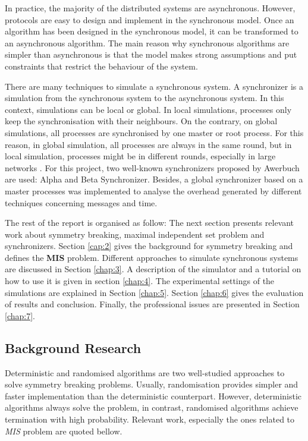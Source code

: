 In practice, the majority of the distributed systems are asynchronous. However, protocols are easy to design and implement in the synchronous model. Once an algorithm has been designed in the synchronous model, it can be transformed to an asynchronous algorithm. The main reason why synchronous algorithms are simpler than asynchronous is that the model makes strong assumptions and put constraints that restrict the behaviour of the system.

There are many techniques to simulate a synchronous system. A synchronizer is a simulation from the synchronous system to the asynchronous system. In this context, simulations can be local or global. In local simulations, processes only keep the synchronisation with their neighbours. On the contrary, on global simulations, all processes are synchronised by one master or root process.  For this reason, in global simulation, all processes are always in the same round, but in local simulation, processes might be in different rounds, especially in large networks \cite{attiya2004distributed}. For this project, two well-known synchronizers proposed by Awerbuch \cite{awerbuch1985complexity} are used: Alpha and Beta Synchronizer. Besides, a global synchronizer based on a master processes was implemented to analyse the overhead generated by different techniques concerning messages and time.


The rest of the report is organised as follow: The next section presents relevant work about symmetry breaking, maximal independent set problem and synchronizers. Section \ref{cap:2} gives the background for symmetry breaking and defines the \textbf{MIS} problem. Different approaches to simulate synchronous systems are discussed in Section \ref{chap:3}. A description of the simulator and a tutorial on how to use it is given in section \ref{chap:4}. The experimental settings of the simulations are explained in Section \ref{chap:5}. Section \ref{chap:6} gives the evaluation of results and conclusion. Finally, the professional issues are presented in Section \ref{chap:7}. 

\subsection{Background Research}
 
Deterministic and randomised algorithms are two well-studied approaches to solve symmetry breaking problems. Usually, randomisation provides simpler and faster implementation than the deterministic counterpart. However, deterministic algorithms always solve the problem, in contrast, randomised algorithms achieve termination with high probability. Relevant work, especially the ones related to \textit{MIS} problem are quoted bellow.

